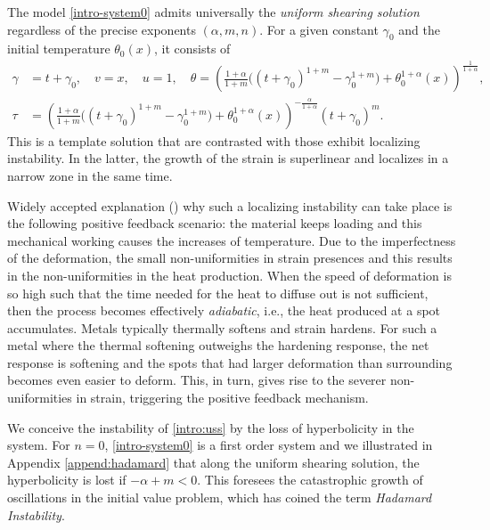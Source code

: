 \documentclass[a4paper,11pt]{article}
\theoremstyle{remark}
\begin{document}
The model \eqref{intro-system0} admits universally the {\it uniform shearing solution} regardless of the precise exponents $(\alpha,m,n)$. For a given constant $\gamma_0$ and the initial temperature $\theta_0(x)$, it consists of
\begin{equation} \label{intro:uss}
 \begin{aligned}
 \gamma &= t+\gamma_0, \quad v=x, \quad u=1, \quad \theta = \left( \frac{1+\alpha}{1+m} \big( (t+\gamma_0)^{1+m}-\gamma_0^{1+m}\big) + \theta_0^{1+\alpha}(x)\right)^{\frac{1}{1+\alpha}}, \\
 \tau&=\left( \frac{1+\alpha}{1+m} \big( (t+\gamma_0)^{1+m}-\gamma_0^{1+m}\big) + \theta_0^{1+\alpha}(x)\right)^{-\frac{\alpha}{1+\alpha}}(t+\gamma_0)^m.
 \end{aligned}
\end{equation}
This is a template solution that are contrasted with those exhibit localizing instability. In the latter, the growth of the strain is superlinear and localizes in a narrow zone in the same time.

Widely accepted explanation (\cite{shawki_shear_1989,clifton_rev_1990}) why such a localizing instability can take place is the following positive feedback scenario: the material keeps loading and
this mechanical working causes the increases of temperature. Due to the imperfectness of the deformation, the small non-uniformities in strain presences and this results in the non-uniformities in the heat production. When the speed of deformation is so high such that the time needed for the heat to diffuse out is not sufficient, then the process becomes effectively {\it adiabatic}, i.e., the heat produced at a spot accumulates. Metals typically thermally softens and strain hardens. For such a metal where the thermal softening outweighs the hardening response, the net response is softening and the spots that had larger deformation than surrounding becomes even easier to deform. This, in turn, gives rise to the severer non-uniformities in strain, triggering the positive feedback mechanism.

We conceive the instability of \eqref{intro:uss} by the loss of hyperbolicity in the system. For $n=0$, \eqref{intro-system0} is a first order system and we illustrated in Appendix \ref{append:hadamard} that along the uniform shearing solution, the hyperbolicity is lost if $-\alpha+m<0$. This foresees the catastrophic growth of oscillations in the initial value problem, which has coined the term {\it Hadamard Instability}.
\end{document}
